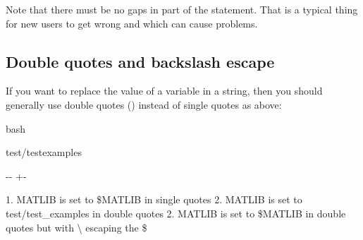 \documentclass[letterpaper,10pt,english]{sphinxmanual}
\newlength\nbsphinxcodecellspacing
\begin{document}
Note that there must be no gaps in  part of the statement. That is a typical thing for new users to get wrong and which can cause problems.


\subsection{Double quotes  and backslash escape \sphinxstyleliteralintitle{\sphinxupquote{/}}}
\label{\detokenize{Appendix1:Double-quotes-"-and-backslash-escape-/}}
If you want to replace the value of a variable in a string, then you should generally use double quotes () instead of single quotes \sphinxcode{\sphinxupquote{\textquotesingle{}}} as above:

{
\begin{sphinxVerbatim}[commandchars=\\\{\}]
\llap{\color{nbsphinxin}[2]:\,\hspace{\fboxrule}\hspace{\fboxsep}}\PYGZpc{}\PYGZpc{}bash

 test/test\PYGZus{}examples

 
 
 
\end{sphinxVerbatim}
}

{

\kern-\sphinxverbatimsmallskipamount\kern-\baselineskip
\kern+\FrameHeightAdjust\kern-\fboxrule
\vspace{\nbsphinxcodecellspacing}

\begin{sphinxVerbatim}[commandchars=\\\{\}]
1. MATLIB is set to \$MATLIB in single quotes
2. MATLIB is set to test/test\_examples in double quotes
2. MATLIB is set to \$MATLIB in double quotes but with \textbackslash{} escaping the \$
\end{sphinxVerbatim}
}
\end{document}
